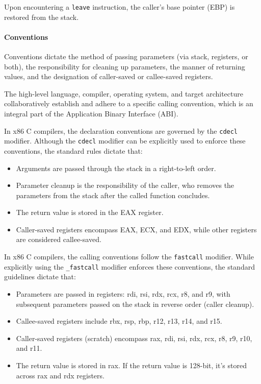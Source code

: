 Upon encountering a \texttt{leave} instruction, the caller's base pointer (EBP) is restored from the stack.

\paragraph*{Conventions}
Conventions dictate the method of passing parameters (via stack, registers, or both), the responsibility for cleaning up parameters, the manner of returning values, and the designation of caller-saved or callee-saved registers.

The high-level language, compiler, operating system, and target architecture collaboratively establish and adhere to a specific calling convention, which is an integral part of the Application Binary Interface (ABI).

In x86 C compilers, the declaration conventions are governed by the \texttt{cdecl} modifier. 
Although the \texttt{cdecl} modifier can be explicitly used to enforce these conventions, the standard rules dictate that:
\begin{itemize}
    \item Arguments are passed through the stack in a right-to-left order.
    \item Parameter cleanup is the responsibility of the caller, who removes the parameters from the stack after the called function concludes.
    \item The return value is stored in the EAX register.
    \item Caller-saved registers encompass EAX, ECX, and EDX, while other registers are considered callee-saved.
\end{itemize}
In x86 C compilers, the calling conventions follow the \texttt{fastcall} modifier. 
While explicitly using the \texttt{\_fastcall} modifier enforces these conventions, the standard guidelines dictate that:
\begin{itemize}
    \item Parameters are passed in registers: rdi, rsi, rdx, rcx, r8, and r9, with subsequent parameters passed on the stack in reverse order (caller cleanup).
    \item Callee-saved registers include rbx, rsp, rbp, r12, r13, r14, and r15.
    \item Caller-saved registers (scratch) encompass rax, rdi, rsi, rdx, rcx, r8, r9, r10, and r11.
    \item The return value is stored in rax. 
        If the return value is 128-bit, it's stored across rax and rdx registers.
\end{itemize}